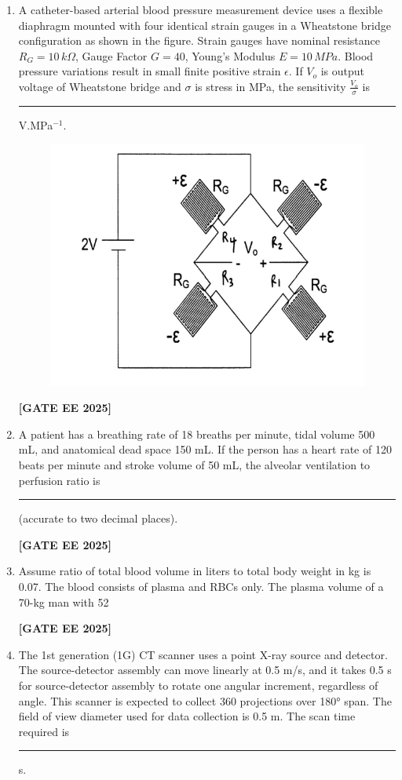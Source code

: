 \documentclass[journal]{IEEEtran}
\newcommand{\qfooter}{%
  \begin{flushright}\footnotesize\textbf{[GATE EE 2025]}\end{flushright}\vspace{1em}%
}
\begin{document}
\begin{enumerate}
\qfooter

\item A catheter-based arterial blood pressure measurement device uses a flexible diaphragm mounted with four identical strain gauges in a Wheatstone bridge configuration as shown in the figure.
Strain gauges have nominal resistance \(R_G = 10\,k\Omega\), Gauge Factor \(G = 40\), Young’s Modulus \(E = 10\,MPa\).
Blood pressure variations result in small finite positive strain \(\epsilon\).
If \(V_o\) is output voltage of Wheatstone bridge and \(\sigma\) is stress in MPa, the sensitivity \(\frac{V_o}{\sigma}\) is \rule{2cm}{0.15mm} V.MPa\(^{-1}\).

\begin{figure}[H]
    \centering
    \includegraphics[width=0.6\columnwidth]{figs/q61.png}
\end{figure}

\qfooter

\item A patient has a breathing rate of 18 breaths per minute, tidal volume 500 mL, and anatomical dead space 150 mL.
If the person has a heart rate of 120 beats per minute and stroke volume of 50 mL, the alveolar ventilation to perfusion ratio is \rule{2cm}{0.15mm} (accurate to two decimal places).

\qfooter

\item Assume ratio of total blood volume in liters to total body weight in kg is 0.07.
The blood consists of plasma and RBCs only.
The plasma volume of a 70-kg man with 52%

\qfooter

\item The 1st generation (1G) CT scanner uses a point X-ray source and detector.
The source-detector assembly can move linearly at 0.5 m/s, and it takes 0.5 s for source-detector assembly to rotate one angular increment, regardless of angle.
This scanner is expected to collect 360 projections over 180° span.
The field of view diameter used for data collection is 0.5 m.
The scan time required is \rule{2cm}{0.15mm} s.


\end{enumerate}
\end{document}

